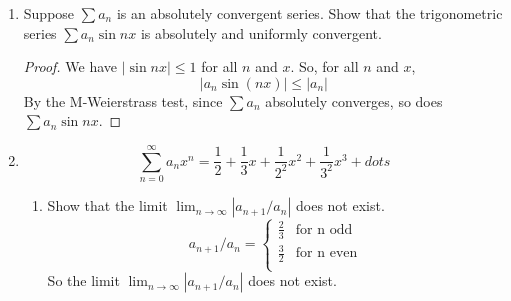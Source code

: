 \documentclass[hidelinks,12pt]{article}
\title{\scalebox{2}{Math 524 Homework 3}}
\author{\scalebox{1.5}{Theo Koss}}
\date{March 2024}
\renewcommand{\leq}{\leqslant}
\begin{document}
\maketitle
\begin{enumerate}
    \item Suppose $\sum a_n$ is an absolutely convergent series. Show that the trigonometric series $\sum a_n\sin nx$ is absolutely and uniformly convergent.
        \begin{proof}[Proof]
            We have $|\sin nx|\leq1$ for all $n$ and $x$. So, for all $n$ and $x$, \[|a_n\sin(nx)|\leq|a_n|\] By the M-Weierstrass test, since $\sum a_n$ absolutely converges, so does $\sum a_n\sin nx$.
        \end{proof}
    \item \[\sum_{n=0}^{\infty}a_nx^n=\frac{1}{2}+\frac{1}{3}x+\frac{1}{2^2}x^2+\frac{1}{3^2}x^3+dots\]
        \begin{enumerate}
            \item Show that the limit $\lim_{n\to\infty}|a_{n+1}/a_n|$ does not exist.
                \[a_{n+1}/a_n=\begin{cases}
                    \frac{2}{3} & \text{for n odd}\\
                    \frac{3}{2} & \text{for n even}\\
                \end{cases}\]
                So the limit $\lim_{n\to\infty}|a_{n+1}/a_n|$ does not exist.


\end{enumerate}
\end{enumerate}
\end{document}
